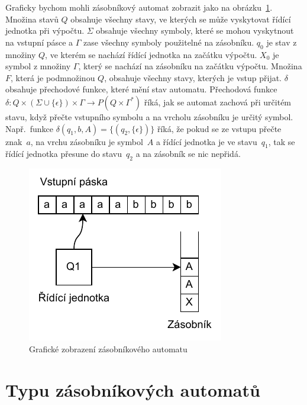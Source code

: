 Graficky bychom mohli zásobníkový automat zobrazit jako na obrázku~\ref{fig:PDAComponents}. Množina stavů $Q$ obsahuje všechny stavy, ve kterých se může vyskytovat řídící jednotka při výpočtu. $\Sigma$ obsahuje všechny symboly, které se mohou vyskytnout na vstupní pásce a $\Gamma$ zase všechny symboly použitelné na zásobníku. $q_0$ je stav z množiny $Q$, ve kterém se nachází řídící jednotka na začátku výpočtu. $X_0$ je symbol z množiny $\Gamma$, který se nachází na zásobníku na začátku výpočtu. Množina $F$, která je podmnožinou $Q$, obsahuje všechny stavy, kterých je vstup přijat. $\delta$ obsahuje přechodové funkce, které mění stav automatu. Přechodová funkce $\delta : Q \times (\Sigma \cup \{\epsilon\}) \times \Gamma \rightarrow P(Q \times \Gamma^*)$ říká, jak se automat zachová při určitém stavu, když přečte vstupního symbolu a na vrcholu zásobníku je určitý symbol. Např.\ funkce $\delta(q_1,b,A) = \{(q_2,\{\epsilon\})\}$ říká, že pokud se ze vstupu přečte znak~$a$, na vrchu zásobníku je symbol~$A$ a řídící jednotka je ve stavu~$q_1$, tak se řídící jednotka přesune do stavu~$q_2$ a na zásobník se nic nepřidá.

\begin{figure}[h]
    \centering
    \includegraphics{Figures/PDAComponents.drawio.pdf}
    \caption{Grafické zobrazení zásobníkového automatu}\label{fig:PDAComponents}
\end{figure}

\section{Typu zásobníkových automatů}\label{sec:TypesOfPDA}

